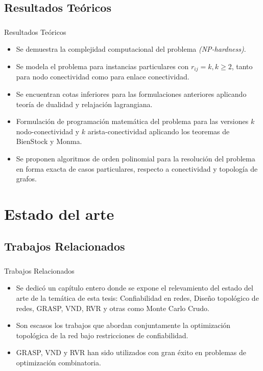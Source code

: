 \subsection{Resultados Teóricos}
\begin{frame}
	\frametitle{}
    \begin{block}{Resultados Teóricos}
    \begin{small}
		\begin{itemize} 
    		\item Se demuestra la complejidad computacional del problema \emph{(NP-hardness)}.
			\item Se modela el problema para instancias particulares con $r_{ij} = k, k \geq 2$, tanto para nodo conectividad como para enlace conectividad.
			\item Se encuentran cotas inferiores para las formulaciones anteriores aplicando teoría de dualidad y relajación lagrangiana.
	    	\item Formulación de programación matemática del problema para las versiones $k$ nodo-conectividad y $k$ arista-conectividad aplicando los teoremas de BienStock y Monma.
    		\item Se proponen algoritmos de orden polinomial para la resolución del problema en forma exacta de casos particulares, respecto a conectividad y topología de grafos.
    	\end{itemize} 
    			\end{small}
    \end{block}
\end{frame}

\section{Estado del arte}
\subsection{Trabajos Relacionados}
\begin{frame}\frametitle{}
\begin{block}{Trabajos Relacionados}
	\begin{itemize} 
    	\item Se dedicó un capítulo entero donde se expone el relevamiento del estado del arte de la temática de esta tesis: Confiabilidad en redes, Diseño topológico de redes, GRASP, VND, RVR y otras como Monte Carlo Crudo.
    	\item Son escasos los trabajos que abordan conjuntamente la optimización topológica de la red  bajo restricciones de confiabilidad.
    	\item GRASP, VND y RVR han sido utilizados con gran éxito en problemas de optimización combinatoria.
    \end{itemize} 
\end{block}
\end{frame}

